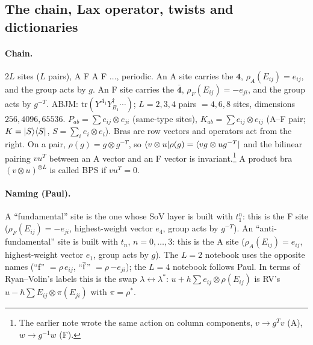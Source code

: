 \subsection{The chain, Lax operator, twists and dictionaries}\label{sec:conv-chain}

\paragraph{Chain.} $2L$ sites ($L$ pairs), A F A F $\dots$, periodic. An A site carries the $\mathbf4$,
$\rho_A(E_{ij})=e_{ij}$, and the group acts by $g$. An F site carries the $\bar{\mathbf4}$, $\rho_F(E_{ij})=-e_{ji}$, and the
group acts by $g^{-T}$. ABJM: $\mathrm{tr}(Y^{A_1}Y^\dagger_{B_1}\cdots)$; $L=2,3,4$ pairs $=4,6,8$ sites, dimensions
$256,4096,65536$. $P_{ab}=\sum e_{ij}\otimes e_{ji}$ (same-type sites), $K_{ab}=\sum e_{ij}\otimes e_{ij}$ (A--F pair;
$K=|S\rangle\langle S|$, $S=\sum_ie_i\otimes e_i$). Bras are row vectors and operators act from the right. On a pair,
$\rho(g)=g\otimes g^{-T}$, so $\langle v\otimes u|\rho(g)=\langle vg\otimes ug^{-T}|$ and the bilinear pairing $vu^T$ between an A
vector and an F vector is invariant.\footnote{The earlier note wrote the same action on column components,
$v\to g^Tv$ (A), $w\to g^{-1}w$ (F).} A product bra $(v\otimes u)^{\otimes L}$ is called BPS if $vu^T=0$.

\paragraph{Naming (Paul).} A ``fundamental'' site is the one whose SoV layer is built with $t_1^n$: this is the F site
($\rho_F(E_{ij})=-e_{ji}$, highest-weight vector $e_4$, group acts by $g^{-T}$). An ``anti-fundamental'' site is built with
$t_n$, $n=0,\dots,3$: this is the A site ($\rho_A(E_{ij})=e_{ij}$, highest-weight vector $e_1$, group acts by $g$).
The $L=2$ notebook  uses the opposite names (``f'' $=\rho\,e_{ij}$, ``$\bar{\rm f}$''
$=\rho\,{-e_{ji}}$); the $L=4$ notebook follows Paul. In terms of Ryan--Volin's labels this is the swap
$\lambda\leftrightarrow\lambda^*$: $u+h\sum e_{ij}\otimes\rho(E_{ij})$ is RV's $u-\hbar\sum E_{ij}\otimes\pi(E_{ji})$ with
$\pi=\rho^*$.

